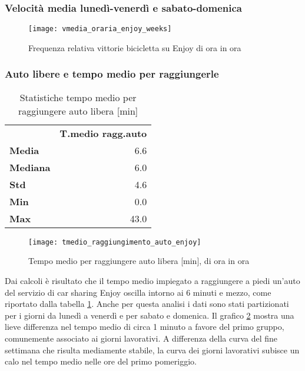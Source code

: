 \subsubsection{Velocità media lunedì-venerdì e sabato-domenica}

\begin{figure}[H]
	\texttt{[image: vmedia\_oraria\_enjoy\_weeks]}
	\caption{Frequenza relativa vittorie bicicletta su Enjoy di ora in ora}
	\label{image:16}
\end{figure}


\subsubsection{Auto libere e tempo medio per raggiungerle}

\begin{table}[H]
\centering
\begin{tabular}{ | l r | }
\hline
& \textbf{T.medio ragg.auto} \\
\textbf{Media}   &  6.6 \\
\textbf{Mediana} &  6.0 \\
\textbf{Std}     &  4.6 \\
\textbf{Min}     &  0.0 \\ 
\textbf{Max}     & 43.0 \\
\hline
\end{tabular}
\caption{Statistiche tempo medio per raggiungere auto libera [min]}
\label{table:4}
\end{table}

\begin{figure}[H]
	\texttt{[image: tmedio\_raggiungimento\_auto\_enjoy]}
	\caption{Tempo medio per raggiungere auto libera [min], di ora in ora}
	\label{image:8}
\end{figure}

Dai calcoli è risultato che il tempo medio impiegato a raggiungere a piedi un'auto del servizio di car sharing Enjoy oscilla intorno ai 6 minuti e mezzo, come riportato dalla tabella \ref{table:4}. Anche per questa analisi i dati sono stati partizionati per i giorni da lunedì a venerdì e per sabato e domenica. Il grafico \ref{image:8} mostra una lieve differenza nel tempo medio di circa 1 minuto a favore del primo gruppo, comunemente associato ai giorni lavorativi. A differenza della curva del fine settimana che risulta mediamente stabile, la curva dei giorni lavorativi subisce un calo nel tempo medio nelle ore del primo pomeriggio.

